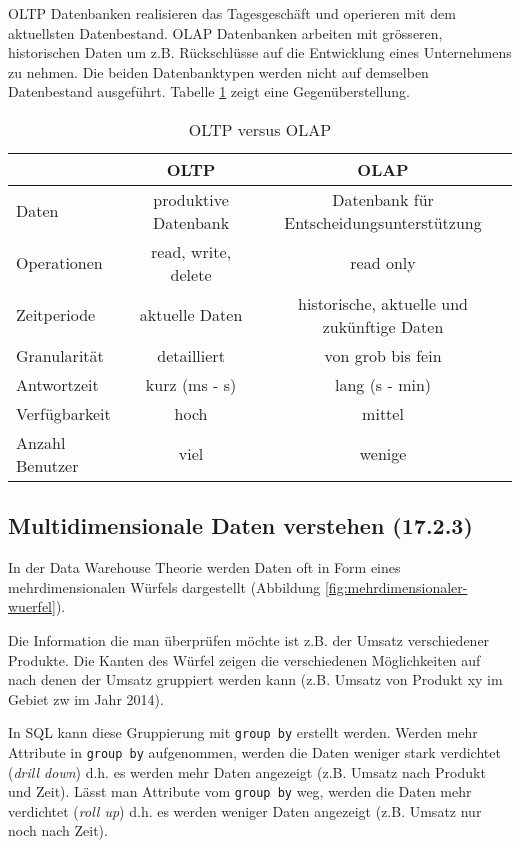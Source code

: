 \ac{OLTP} Datenbanken realisieren das Tagesgeschäft und operieren mit dem aktuellsten Datenbestand. \ac{OLAP} Datenbanken arbeiten mit grösseren, historischen Daten um z.B. Rückschlüsse auf die Entwicklung eines Unternehmens zu nehmen. Die beiden Datenbanktypen werden nicht auf demselben Datenbestand ausgeführt. Tabelle \ref{tab:oltp-olap} zeigt eine Gegenüberstellung.

\begin{table}[h!]
	\centering
	\begin{tabular}{|l|c|c|}
		\hline  				& \ac{OLTP} 			& \ac{OLAP} 									\\ 
		\hline Daten 			& produktive Datenbank 	& Datenbank für Entscheidungsunterstützung 		\\ 
		\hline Operationen		& read, write, delete  	& read only 									\\
		\hline Zeitperiode 		& aktuelle Daten 		& historische, aktuelle und zukünftige Daten 	\\ 
		\hline Granularität 	& detailliert 			& von grob bis fein 							\\ 
		\hline Antwortzeit 		& kurz (ms - s) 		& lang (s - min) 								\\ 
		\hline Verfügbarkeit 	& hoch 					& mittel 										\\ 
		\hline Anzahl Benutzer 	& viel 					& wenige 										\\ 
		\hline 
	\end{tabular}
	\label{tab:oltp-olap}
	\caption{OLTP versus OLAP}
\end{table}


\subsection{Multidimensionale Daten verstehen (17.2.3)}

In der Data Warehouse Theorie werden Daten oft in Form eines mehrdimensionalen Würfels dargestellt (Abbildung \ref{fig:mehrdimensionaler-wuerfel}).


Die Information die man überprüfen möchte ist z.B. der Umsatz verschiedener Produkte. Die Kanten des Würfel zeigen die verschiedenen Möglichkeiten auf nach denen der Umsatz gruppiert werden kann (z.B. Umsatz von Produkt xy im Gebiet zw im Jahr 2014). 

In SQL kann diese Gruppierung mit \verb|group by| erstellt werden. Werden mehr Attribute in \verb|group by| aufgenommen, werden die Daten weniger stark verdichtet (\emph{drill down}) d.h. es werden mehr Daten angezeigt (z.B. Umsatz nach Produkt und Zeit). Lässt man Attribute vom \verb|group by| weg, werden die Daten mehr verdichtet (\emph{roll up}) d.h. es werden weniger Daten angezeigt (z.B. Umsatz nur noch nach Zeit).

